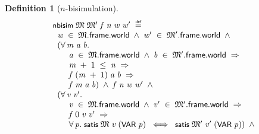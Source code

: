 \documentclass[letterpaper]{article}
\newtheorem{defn}{Definition}
\renewcommand{\HOLConst}[1]{{\textsf{\upshape\small #1}}}
\newenvironment{holmath}{\begin{displaymath}\begin{array}{l}}{\end{array}\end{displaymath}\ignorespacesafterend}
\begin{document}
\begin{defn}[$n$-bisimulation]
\begin{holmath}
  \HOLConst{nbisim}\;\HOLFreeVar{\ensuremath{\mathfrak{M}}}\;\HOLFreeVar{\ensuremath{\mathfrak{M}'}}\;\HOLFreeVar{f}\;\HOLFreeVar{n}\;\HOLFreeVar{w}\;\HOLFreeVar{w\sp{\prime}}\;\HOLSymConst{\HOLTokenDefEquality{}}\\
\;\;\HOLFreeVar{w}\;\HOLSymConst{\HOLTokenIn{}}\;\HOLFreeVar{\ensuremath{\mathfrak{M}}}.\HOLFieldName{frame}.\HOLFieldName{world}\;\HOLSymConst{\HOLTokenConj{}}\;\HOLFreeVar{w\sp{\prime}}\;\HOLSymConst{\HOLTokenIn{}}\;\HOLFreeVar{\ensuremath{\mathfrak{M}'}}.\HOLFieldName{frame}.\HOLFieldName{world}\;\HOLSymConst{\HOLTokenConj{}}\\
\;\;(\HOLSymConst{\HOLTokenForall{}}\HOLBoundVar{m}\;\HOLBoundVar{a}\;\HOLBoundVar{b}.\\
\;\;\;\;\;\;\;\HOLBoundVar{a}\;\HOLSymConst{\HOLTokenIn{}}\;\HOLFreeVar{\ensuremath{\mathfrak{M}}}.\HOLFieldName{frame}.\HOLFieldName{world}\;\HOLSymConst{\HOLTokenConj{}}\;\HOLBoundVar{b}\;\HOLSymConst{\HOLTokenIn{}}\;\HOLFreeVar{\ensuremath{\mathfrak{M}'}}.\HOLFieldName{frame}.\HOLFieldName{world}\;\HOLSymConst{\HOLTokenImp{}}\\
\;\;\;\;\;\;\;\HOLBoundVar{m}\;\HOLSymConst{\ensuremath{+}}\;\HOLNumLit{1}\;\HOLSymConst{\HOLTokenLeq{}}\;\HOLFreeVar{n}\;\HOLSymConst{\HOLTokenImp{}}\\
\;\;\;\;\;\;\;\HOLFreeVar{f}\;(\HOLBoundVar{m}\;\HOLSymConst{\ensuremath{+}}\;\HOLNumLit{1})\;\HOLBoundVar{a}\;\HOLBoundVar{b}\;\HOLSymConst{\HOLTokenImp{}}\\
\;\;\;\;\;\;\;\HOLFreeVar{f}\;\HOLBoundVar{m}\;\HOLBoundVar{a}\;\HOLBoundVar{b})\;\HOLSymConst{\HOLTokenConj{}}\;\HOLFreeVar{f}\;\HOLFreeVar{n}\;\HOLFreeVar{w}\;\HOLFreeVar{w\sp{\prime}}\;\HOLSymConst{\HOLTokenConj{}}\\
\;\;(\HOLSymConst{\HOLTokenForall{}}\HOLBoundVar{v}\;\HOLBoundVar{v\sp{\prime}}.\\
\;\;\;\;\;\;\;\HOLBoundVar{v}\;\HOLSymConst{\HOLTokenIn{}}\;\HOLFreeVar{\ensuremath{\mathfrak{M}}}.\HOLFieldName{frame}.\HOLFieldName{world}\;\HOLSymConst{\HOLTokenConj{}}\;\HOLBoundVar{v\sp{\prime}}\;\HOLSymConst{\HOLTokenIn{}}\;\HOLFreeVar{\ensuremath{\mathfrak{M}'}}.\HOLFieldName{frame}.\HOLFieldName{world}\;\HOLSymConst{\HOLTokenImp{}}\\
\;\;\;\;\;\;\;\HOLFreeVar{f}\;\HOLNumLit{0}\;\HOLBoundVar{v}\;\HOLBoundVar{v\sp{\prime}}\;\HOLSymConst{\HOLTokenImp{}}\\
\;\;\;\;\;\;\;\HOLSymConst{\HOLTokenForall{}}\HOLBoundVar{p}.\;\HOLConst{satis}\;\HOLFreeVar{\ensuremath{\mathfrak{M}}}\;\HOLBoundVar{v}\;(\HOLConst{VAR}\;\HOLBoundVar{p})\;\HOLSymConst{\HOLTokenEquiv{}}\;\HOLConst{satis}\;\HOLFreeVar{\ensuremath{\mathfrak{M}'}}\;\HOLBoundVar{v\sp{\prime}}\;(\HOLConst{VAR}\;\HOLBoundVar{p}))\;\HOLSymConst{\HOLTokenConj{}}\\

\end{holmath}
\end{defn}
\end{document}
